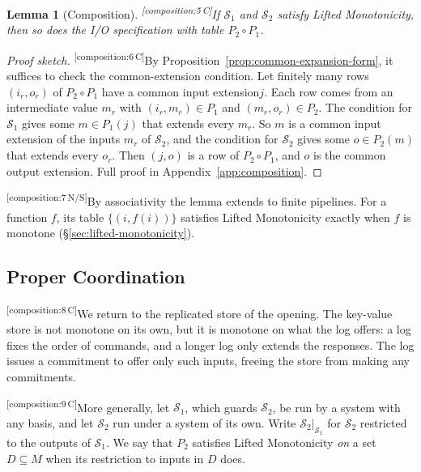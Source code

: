\documentclass[sigconf]{cidr-2027}
\newtheorem{lemma}{Lemma}
\theoremstyle{remark}
\newcommand{\commitment}{commitment\xspace}
\newcommand{\commitments}{commitments\xspace}
\newcommand{\indesc}{input extension\xspace} %
\newcommand{\outrel}{extends\xspace}          %
\newcommand{\outnoun}{output extension\xspace}%
\newcommand{\Spec}{\mathcal{S}}
\newcommand{\spectype}[1][]{I/O specification#1\xspace}
\newcommand{\cxtag}[2]{\textsuperscript{\textsf{\tiny[#1\,#2]}}}
\begin{document}
\color{black!45}\begin{lemma}[Composition]
\label{lem:composition}
\cxtag{composition:5}{C}If $\Spec_1$ and $\Spec_2$ satisfy Lifted Monotonicity, then so does the \spectype with table $P_2\circ P_1$.\color{black}
\end{lemma}

\color{black!45}\begin{proof}[Proof sketch]
\cxtag{composition:6}{C}By Proposition~\ref{prop:common-expansion-form}, it suffices to check the
common-extension condition.  Let finitely many rows $(i_r,o_r)$ of
$P_2\circ P_1$ have a common \indesc $j$.  Each row comes from an intermediate
value $m_r$ with $(i_r,m_r)\in P_1$ and $(m_r,o_r)\in P_2$.  The condition for
$\Spec_1$ gives some $m\in P_1(j)$ that \outrel every $m_r$.  So $m$ is a
common \indesc of the inputs $m_r$ of $\Spec_2$, and the condition for
$\Spec_2$ gives some $o\in P_2(m)$ that \outrel every $o_r$.  Then $(j,o)$ is a
row of $P_2\circ P_1$, and $o$ is the common \outnoun.  Full proof
in Appendix~\ref{app:composition}.\color{black}
\end{proof}

\color{black}\cxtag{composition:7}{N/S}By associativity the lemma extends to finite pipelines.  For a function $f$,
its table $\{(i,f(i))\}$ satisfies Lifted Monotonicity exactly when $f$ is
monotone (\S\ref{sec:lifted-monotonicity}).\color{black}

\subsection{Proper Coordination}
\label{sec:proper-coordination}

\color{black!45}\cxtag{composition:8}{C}We return to the replicated store of the opening.  The key-value store is not
monotone on its own, but it is monotone on what the log offers: a log fixes
the order of commands, and a longer log only extends the responses.  The log
issues a \commitment to offer only such inputs, freeing the store from making any
\commitments.\color{black}

\color{black!45}\cxtag{composition:9}{C}More generally, let $\Spec_1$, which guards $\Spec_2$, be run by a system with any basis, and
let $\Spec_2$ run under a system of its own.  Write $\Spec_2|_{\Spec_1}$ for $\Spec_2$ restricted to the outputs of
$\Spec_1$.  We say that $P_2$ satisfies Lifted Monotonicity \emph{on} a set
$D\subseteq M$ when its restriction to inputs in $D$ does.\color{black}
\end{document}

